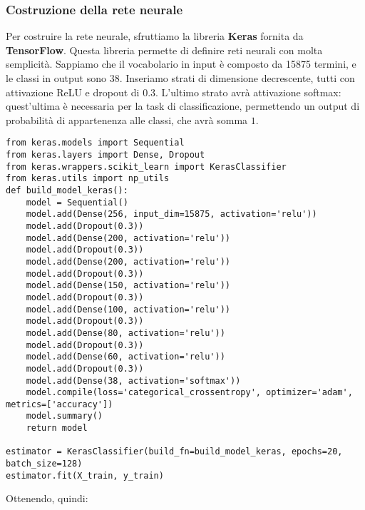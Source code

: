 \subsubsection{Costruzione della rete neurale}
Per costruire la rete neurale, sfruttiamo la libreria \textbf{Keras} fornita da \textbf{TensorFlow}. Questa libreria permette di definire reti neurali con molta semplicità. Sappiamo che il vocabolario in input è composto da 15875 termini, e le classi in output sono 38. Inseriamo strati di dimensione decrescente, tutti con attivazione ReLU e dropout di $0.3$. L'ultimo strato avrà attivazione softmax: quest'ultima è necessaria per la task di classificazione, permettendo un output di probabilità di appartenenza alle classi, che avrà somma $1$.
\begin{verbatim}
from keras.models import Sequential
from keras.layers import Dense, Dropout
from keras.wrappers.scikit_learn import KerasClassifier
from keras.utils import np_utils
def build_model_keras():
    model = Sequential()
    model.add(Dense(256, input_dim=15875, activation='relu'))
    model.add(Dropout(0.3))
    model.add(Dense(200, activation='relu'))
    model.add(Dropout(0.3))
    model.add(Dense(200, activation='relu'))
    model.add(Dropout(0.3))
    model.add(Dense(150, activation='relu'))
    model.add(Dropout(0.3))
    model.add(Dense(100, activation='relu'))
    model.add(Dropout(0.3))
    model.add(Dense(80, activation='relu'))
    model.add(Dropout(0.3))
    model.add(Dense(60, activation='relu'))
    model.add(Dropout(0.3))
    model.add(Dense(38, activation='softmax'))
    model.compile(loss='categorical_crossentropy', optimizer='adam', metrics=['accuracy'])
    model.summary()
    return model

estimator = KerasClassifier(build_fn=build_model_keras, epochs=20, batch_size=128)
estimator.fit(X_train, y_train)
\end{verbatim}
Ottenendo, quindi:
